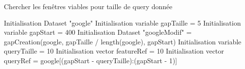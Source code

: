 \documentclass[french]{article}
\begin{document}
\begin{algorithm}
 \DontPrintSemicolon
 \caption{Chercher les fenêtres viables pour taille de query donnée}
 
Initialisation Dataset "google" \;
Initialisation variable gapTaille = 5 \;
Initialisation variable gapStart = 400 \;
Initialisation Dataset "googleModif" =  gapCreation(google, gapTaille / length(google), gapStart)\;
Initialisation variable queryTaille = 10 \;
Initialisation vector featureRef = 10 \;
Initialisation vector queryRef = google[(gapStart - queryTaille):(gapStart - 1)] \;




\;
\;

\end{algorithm}
\end{document}
